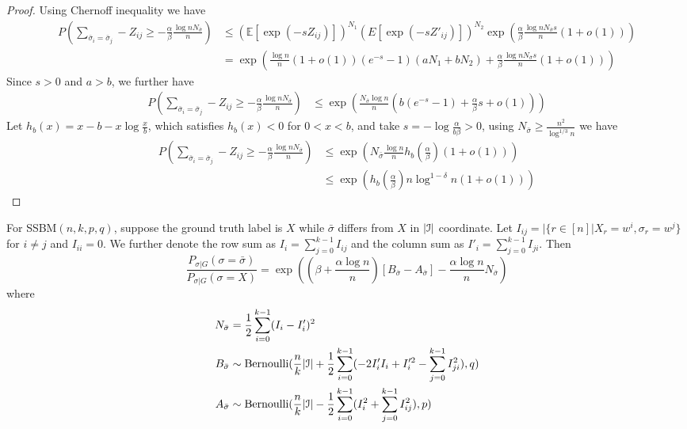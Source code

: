 \documentclass{article}
\begin{document}
\begin{proof}
	Using Chernoff inequality we have
	\begin{align*}
	P(\sum_{ \bar{\sigma}_i  = \bar{\sigma}_j } -Z_{ij} \geq -\frac{\alpha}{\beta}\frac{\log n N_{\bar{\sigma}}}{n})&
	\leq (\mathbb{E}[\exp(-s Z_{ij})])^{N_1} (E[\exp(-s Z'_{ij})])^{N_2} \exp(\frac{\alpha}{\beta} \frac{\log n N_{\bar{\sigma}} s}{n}(1+o(1))) \\
	&= \exp( \frac{\log n}{n}(1+o(1))(e^{-s}-1)(aN_1 + bN_2)+\frac{\alpha}{\beta} \frac{\log n N_{\bar{\sigma}} s}{n}(1+o(1)))
	\end{align*}
	Since $s > 0$ and $a>b$, we further have
	\begin{align*}
	P(\sum_{ \bar{\sigma}_i  = \bar{\sigma}_j } -Z_{ij} \geq -\frac{\alpha}{\beta}\frac{\log n N_{\bar{\sigma}}}{n})
	& \leq \exp( \frac{N_{\bar{\sigma}}\log n }{n}(b(e^{-s}-1)+ \frac{\alpha}{\beta}s + o(1))) 
	\end{align*}
	Let $h_b(x) = x - b -x\log \frac{x}{b}$, which satisfies $h_b(x) < 0$ for $0<x<b$,
	and take $s=-\log\frac{\alpha}{b\beta} > 0$, using 
	$N_{\bar{\sigma}} \geq \frac{n^2}{\log^{1/3} n}$ we have
	\begin{align*}
	P(\sum_{ \bar{\sigma}_i  = \bar{\sigma}_j } -Z_{ij} \geq -\frac{\alpha}{\beta}\frac{\log n N_{\bar{\sigma}}}{n})&\leq \exp( N_{\bar{\sigma}} \frac{\log n}{n} h_b(\frac{\alpha}{\beta})(1+o(1))) \\
	& \leq \exp (h_b(\frac{\alpha}{\beta}) n \log^{1-\delta} n (1+o(1)))
	\end{align*}
\end{proof}
\begin{lemma}\label{lem:minus}
	For SSBM$(n,k,p,q)$, suppose the ground truth label is $X$ while $\bar{\sigma}$ differs from $X$ in $|\mathcal{I}|$ coordinate.
	Let $I_{ij} = |\{r\in [n] | X_r = w^i, \sigma_r = w^j \}$ for $i\neq j$ and $I_{ii} = 0$. We further denote the row sum as $I_i = \sum_{j=0}^{k-1} I_{ij}$ and
	the column sum as $I'_i = \sum_{j=0}^{k-1} I_{ji}$.
	Then
	\begin{equation}\label{eq:general_expansion}
\frac{P_{\sigma|G}(\sigma=\bar{\sigma})}{P_{\sigma|G}(\sigma=X)} = \exp((\beta + \frac{\alpha \log n}{n})[B_{\bar{\sigma}} - A_{\bar{\sigma}}] - \frac{\alpha \log n}{n} N_{\bar{\sigma}})
\end{equation}
	where 
	\begin{align}
	N_{\bar{\sigma}} &= \frac{1}{2}\sum_{i=0}^{k-1} (I_i - I_i')^2 \label{eq:N_w} \\
	B_{\bar{\sigma}} & \sim \textrm{Bernoulli}(\frac{n}{k}|\mathcal{I}| + \frac{1}{2}\sum_{i=0}^{k-1}  (-2 I'_i I_i  + I'^2_i - \sum_{j=0}^{k-1} I^2_{ji}) , q)\\
	A_{\bar{\sigma}} & \sim \textrm{Bernoulli}(\frac{n}{k}|\mathcal{I}| - \frac{1}{2}\sum_{i=0}^{k-1}  (I^2_i + \sum_{j=0}^{k-1} I^2_{ij}), p) \label{eq:A_w}
	\end{align}
\end{lemma}
\end{document}
